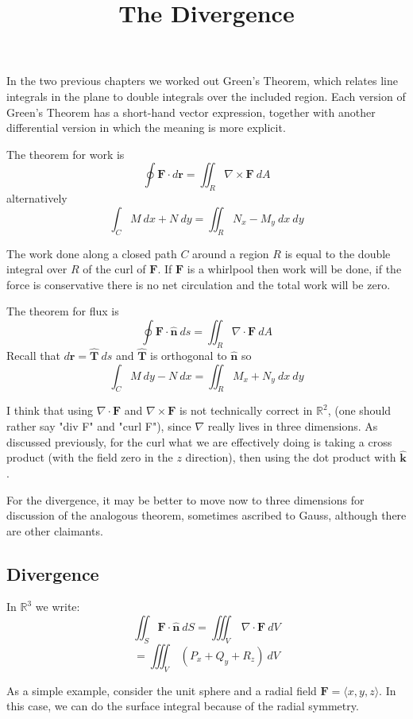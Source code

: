 \documentclass[11pt, oneside]{article}
\title{The Divergence}
\date{}
\begin{document}
\maketitle
\Large


In the two previous chapters we worked out Green's Theorem, which relates line integrals in the plane to double integrals over the included region.  Each version of Green's Theorem has a short-hand vector expression, together with another differential version in which the meaning is more explicit.  

The theorem for work is
\[ \oint \mathbf{F} \cdot d \mathbf{r} = \iint_R \nabla \times \mathbf{F} \ dA \]
alternatively
\[ \int_C M \ dx + N \ dy = \iint_R N_x - M_y \ dx \ dy \]

The work done along a closed path $C$ around a region $R$ is equal to the double integral over $R$ of the curl of $\mathbf{F}$.  If $\mathbf{F}$ is a whirlpool then work will be done, if the force is conservative there is no net circulation and the total work will be zero.

The theorem for flux is
\[ \oint \mathbf{F} \cdot  \mathbf{\hat{n}} \ ds  = \iint_R \nabla \cdot \mathbf{F} \ dA \]
Recall that $d\mathbf{r} = \mathbf{\hat{T}} \ ds$ and $\mathbf{\hat{T}}$ is orthogonal to $\mathbf{\hat{n}}$ so
\[ \int_C M \ dy - N \ dx = \iint_R M_x + N_y \ dx \ dy \]

I think that using $\nabla \cdot \mathbf{F}$ and $\nabla \times \mathbf{F}$ is not technically correct in $\mathbb{R}^2$, (one should rather say "div F" and "curl F"), since $\nabla$ really lives in three dimensions.  As discussed previously, for the curl what we are effectively doing is taking a cross product (with the field zero in the $z$ direction), then using the dot product with $\mathbf{\hat{k}}$.  

For the divergence, it may be better to move now to three dimensions for discussion of the analogous theorem, sometimes ascribed to Gauss, although there are other claimants.

\subsection*{Divergence}

In $\mathbb{R}^3$ we write:
\[ \iint_S \mathbf{F} \cdot \mathbf{\hat{n}} \ dS  = \iiint_V \ \nabla \cdot \mathbf{F} \ dV \]
\[ =  \iiint_V \ (P_x + Q_y + R_z )\ dV \]

As a simple example, consider the unit sphere and a radial field $\mathbf{F} = \langle x,y,z \rangle$.  In this case, we can do the surface integral because of the radial symmetry.  
\end{document}
